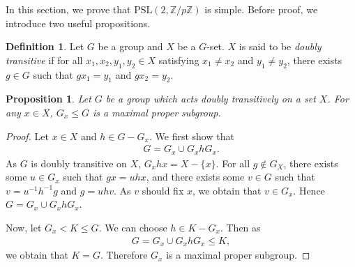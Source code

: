 \documentclass[12pt]{report}
\theoremstyle{plain}
\newtheorem{proposition}[theorem]{Proposition}
\theoremstyle{remark}
\theoremstyle{definition}
\newtheorem{definition}[theorem]{Definition}
\newcommand{\Z}{\mathbb{Z}}
\begin{document}
In this section, we prove that $\mathrm{PSL}(2,\Z/p\Z)$ is simple. Before proof, we introduce two useful propositions.

\begin{definition}
    Let $G$ be a group and $X$ be a $G$-set. $X$ is said to be \emph{doubly transitive} if for all $x_1,x_2,y_1,y_2\in X$ satisfying $x_1\neq x_2$ and $y_1\neq y_2$, there exists $g\in G$ such that $gx_1=y_1$ and $gx_2=y_2$.
\end{definition}

\begin{proposition}\label{Proposition 1.16.3.}
    Let $G$ be a group which acts doubly transitively on a set $X$. For any $x\in X$, $G_x\le G$ is a maximal proper subgroup.
\end{proposition}
\begin{proof}
    Let $x\in X$ and $h\in G-G_x$. We first show that
    \begin{align*}
        G=G_x \cup G_x h G_x.
    \end{align*}
    As $G$ is doubly transitive on $X$, $G_xhx = X-\{x\}$. For all $g\not\in G_X$, there exists some $u\in G_x$ such that $gx = uhx$, and there exists some $v\in G$ such that $v = u^{-1}h^{-1}g$ and $g=uhv$. As $v$ should fix $x$, we obtain that $v\in G_x$. Hence $G=G_x \cup G_x h G_x$.

    Now, let $G_x < K \le G$. We can choose $h\in K-G_x$. Then as
    \begin{align*}
        G = G_x\cup G_x h G_x \le K,
    \end{align*}
    we obtain that $K=G$. Therefore $G_x$ is a maximal proper subgroup.
\end{proof}
\end{document}
